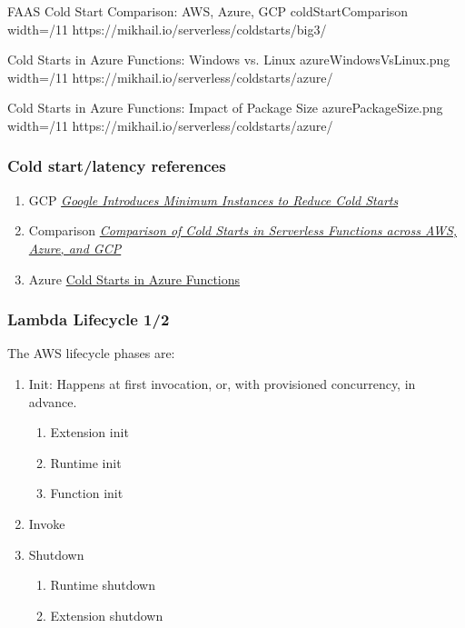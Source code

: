 \documentclass[11pt,aspectratio=169]{beamer}
\begin{document}
\nrcanGraphicFrame
  {FAAS Cold Start Comparison: AWS, Azure, GCP}
  {coldStartComparison}
  {width=/11}
  {https://mikhail.io/serverless/coldstarts/big3/}

  \nrcanGraphicFrame
  {Cold Starts in Azure Functions: Windows vs. Linux}
  {azureWindowsVsLinux.png}
  {width=/11}
  {https://mikhail.io/serverless/coldstarts/azure/}

  \nrcanGraphicFrame
  {Cold Starts in Azure Functions: Impact of Package Size}
  {azurePackageSize.png}
  {width=/11}
  {https://mikhail.io/serverless/coldstarts/azure/}


\begin{nrcanFrame}
  \frametitle{Cold start/latency references}
  \begin{enumerate}
  \item GCP \textit{\href{https://www.infoq.com/news/2021/09/cloud-functions-min-instances/}{Google Introduces Minimum Instances to Reduce Cold Starts}}
  \item Comparison \textit{\href{https://mikhail.io/serverless/coldstarts/big3/}{Comparison of Cold Starts in Serverless Functions across AWS, Azure, and GCP}}
  \item Azure \href{https://mikhail.io/serverless/coldstarts/azure/}{Cold Starts in Azure Functions}
  \end{enumerate}

\end{nrcanFrame}


\begin{nrcanFrame}
  \frametitle{Lambda Lifecycle 1/2}
  The AWS lifecycle phases are:
  \begin{enumerate}
  \item Init: Happens at first invocation, or, with provisioned
    concurrency, in advance.
    \begin{enumerate}
    \item Extension init
    \item Runtime init
    \item Function init
    \end{enumerate}
  \item Invoke
  \item Shutdown 
    \begin{enumerate}
    \item Runtime shutdown
    \item Extension shutdown
    \end{enumerate}
  \end{enumerate}
\end{nrcanFrame}
\end{document}
